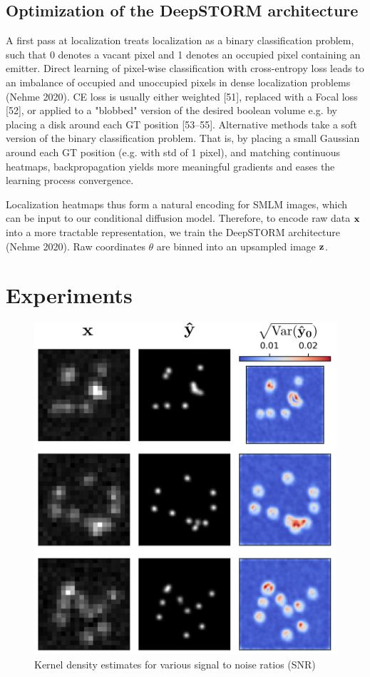 \documentclass{article}
\begin{document}
\subsection{Optimization of the DeepSTORM architecture}

A first pass at localization treats localization as a binary classification problem, such that 0 denotes a vacant pixel and 1 denotes an occupied pixel containing an emitter. Direct learning of pixel-wise classification with cross-entropy loss leads to an imbalance of occupied and unoccupied pixels in dense localization problems (Nehme 2020). CE loss is usually either weighted [51], replaced with a Focal loss [52], or applied to a "blobbed" version of the desired boolean volume e.g. by placing a disk around each GT position [53–55]. Alternative methods take a soft version of the binary classification problem. That is, by placing a small Gaussian around each GT position (e.g. with std of 1 pixel), and matching continuous heatmaps, backpropagation yields more meaningful gradients and eases the learning process convergence. 

Localization heatmaps thus form a natural encoding for SMLM images, which can be input to our conditional diffusion model. Therefore, to encode raw data $\bold{x}$ into a more tractable representation, we train the DeepSTORM architecture (Nehme 2020). Raw coordinates $\theta$ are binned into an upsampled image $\bold{z}$. 


\section{Experiments}

\begin{figure}
\centering
\includegraphics[scale=0.8]{Samples.png}
\caption{Kernel density estimates for various signal to noise ratios (SNR)}
\end{figure}
\end{document}
